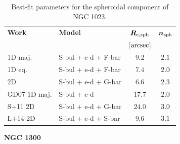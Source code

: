 \documentclass[preprint2]{emulateapj}
\begin{document}
  \begin{table}[h]
  \small
  \caption{Best-fit parameters for the spheroidal component of NGC 1023.}
  \begin{center}
  \begin{tabular}{llcc}
  \hline
  {\bf Work} & {\bf Model}   & $\bm R_{\rm e,sph}$    & $\bm n_{\rm sph}$ \\
    &  &  $[\rm arcsec]$ & \\
  \hline
  1D maj. & S-bul + e-d + F-bar & $9.2$  &  $2.1$ \\
  1D eq.  & S-bul + e-d + F-bar & $7.4$  &  $2.0$ \\
  2D      & S-bul + e-d + G-bar & $6.6$  &  $2.3$ \\
  \hline
  GD07 1D maj.    & S-bul + e-d 	& $17.7$  &  $2.0$ \\
  S+11 2D    & S-bul + e-d + G-bar & $24.0$  &  $3.0$ \\
  L+14 2D    & S-bul + e-d + S-bar & $9.6$   &  $3.1$ \\
  \hline
  \end{tabular}
  \end{center}
  \label{tab:n1023}
  \end{table}



  \clearpage\newpage\noindent
  {\bf NGC 1300 \\}
  
\end{document}
